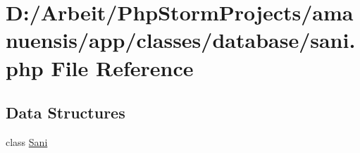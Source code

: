 \hypertarget{sani_8php}{}\section{D\+:/\+Arbeit/\+Php\+Storm\+Projects/amanuensis/app/classes/database/sani.php File Reference}
\label{sani_8php}
\subsection*{Data Structures}
\begin{DoxyCompactItemize}
\item 
class \hyperlink{class_sani}{Sani}
\end{DoxyCompactItemize}
